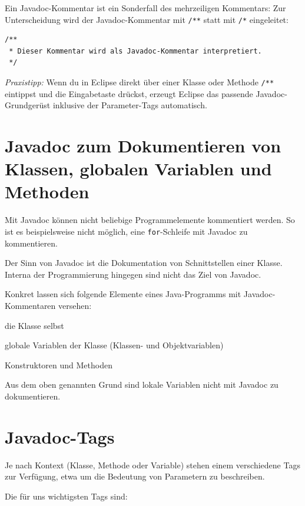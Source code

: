 Ein Javadoc-Kommentar ist ein Sonderfall des mehrzeiligen Kommentars: Zur
Unterscheidung wird der Javadoc-Kommentar mit \lstinline|/**| statt mit
\lstinline|/*| eingeleitet:

\begin{lstlisting}
/**
 * Dieser Kommentar wird als Javadoc-Kommentar interpretiert.
 */
\end{lstlisting}

\noindent \emph{Praxistipp:} Wenn du in Eclipse direkt über einer Klasse oder
Methode \lstinline|/**| eintippst und die Eingabetaste drückst, erzeugt Eclipse
das passende Javadoc-Grundgerüst inklusive der Parameter-Tags automatisch.


\section{Javadoc zum Dokumentieren von Klassen, globalen Variablen und Methoden}

Mit Javadoc können nicht beliebige Programmelemente kommentiert werden. So ist
es beispielsweise nicht möglich, eine \lstinline|for|-Schleife mit Javadoc zu
kommentieren.

Der Sinn von Javadoc ist die Dokumentation von Schnittstellen einer Klasse.
Interna der Programmierung hingegen sind nicht das Ziel von Javadoc.

Konkret lassen sich folgende Elemente eines Java-Programms mit
Javadoc-Kommentaren versehen:

\begin{compactitem}
\item die Klasse selbst
\item globale Variablen der Klasse (Klassen- und Objektvariablen)
\item Konstruktoren und Methoden
\end{compactitem}

Aus dem oben genannten Grund sind lokale Variablen nicht mit Javadoc zu
dokumentieren.


\section{Javadoc-Tags}

Je nach Kontext (Klasse, Methode oder Variable) stehen einem verschiedene Tags
zur Verfügung, etwa um die Bedeutung von Parametern zu beschreiben.

Die für uns wichtigsten Tags sind:

